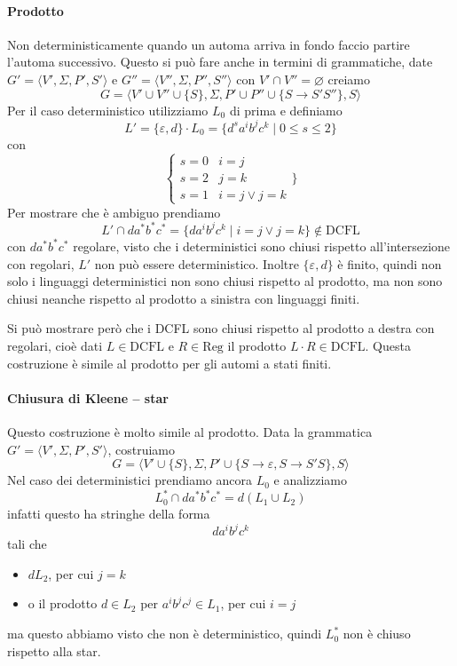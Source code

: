 \documentclass[12pt]{report}
\theoremstyle{definition}
\theoremstyle{regard}
\begin{document}
\paragraph{Prodotto} Non deterministicamente quando un automa arriva in fondo faccio partire l'automa successivo.
Questo si può fare anche in termini di grammatiche, date $G' = \langle V', \Sigma, P', S' \rangle$ e $G'' = \langle V'', \Sigma, P'', S'' \rangle$ con $V' \cap V'' = \varnothing$ creiamo
$$ G = \langle V' \cup V'' \cup \{ S \}, \Sigma, P' \cup P'' \cup \{ S \rightarrow S' S'' \}, S \rangle $$
Per il caso deterministico utilizziamo $L_0$ di prima %
e definiamo
$$ L' = \{ \varepsilon, d \} \cdot L_0 = \{ d^s a^i b^j c^k \mid 0 \leq s \leq 2 \} $$
con 
$$\begin{cases} s = 0 & i = j \\ s = 2 & j = k \\ s = 1 & i = j \vee j = k \end{cases}\} $$
Per mostrare che è ambiguo prendiamo
$$ L' \cap d a^* b^* c^* = \{ d a^i b^j c^k \mid i = j \vee j = k \} \not \in \text{DCFL}$$
con $d a^* b^* c^*$ regolare, visto che i deterministici sono chiusi rispetto all'intersezione con regolari, $L'$ non può essere deterministico.
Inoltre $\{\varepsilon, d\}$ è finito, quindi non solo i linguaggi deterministici non sono chiusi rispetto al prodotto, ma non sono chiusi neanche rispetto al prodotto a sinistra con linguaggi finiti.

Si può mostrare però che i DCFL sono chiusi rispetto al prodotto a destra con regolari, cioè dati $L \in \text{DCFL}$ e $R \in \text{Reg}$ il prodotto $L \cdot R \in \text{DCFL}$.
Questa costruzione è simile al prodotto per gli automi a stati finiti.

\paragraph{Chiusura di Kleene -- star} Questo costruzione è molto simile al prodotto. 
Data la grammatica $G' = \langle V', \Sigma, P', S' \rangle$, costruiamo
$$ G = \langle V' \cup \{ S \}, \Sigma, P' \cup \{ S \rightarrow \varepsilon, S \rightarrow S' S \}, S \rangle $$
Nel caso dei deterministici prendiamo ancora $L_0$ e analizziamo
$$ L_0^* \cap d a^* b^* c^* = d (L_1 \cup L_2) $$
infatti questo ha stringhe della forma
$$ da^ib^jc^k $$
tali che
\begin{itemize}
	\item $dL_2$, per cui $j = k$
	\item o il prodotto $d \in L_2$ per $a^i b^j c^j \in L_1$, per cui $i = j$
\end{itemize}
ma questo abbiamo visto che non è deterministico, quindi $L_0^*$ non è chiuso rispetto alla star.
\end{document}
